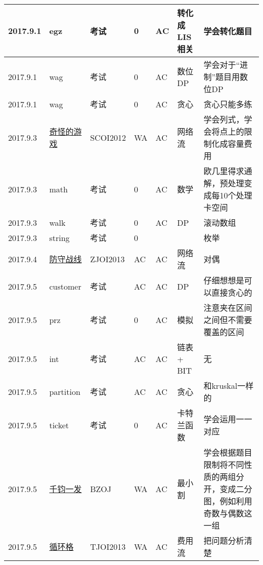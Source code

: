 \documentclass[a4paper]{article}
\begin{document}
\begin{longtable}{|p{1.5cm}|p{2.5cm}|p{1.6cm}|p{1.6cm}|p{1cm}|p{3cm}|p{4cm}|}
		\hline
		2017.9.1 & egz
		 & 考试 & 0 & AC & 转化成LIS相关 & 学会转化题目\\
		
		\hline
		2017.9.1 & wag
		 & 考试 & 0 & AC & 数位DP & 学会对于“进制”题目用数位DP\\
		
		\hline
		2017.9.1 & wag
		 & 考试 & 0 & AC & 贪心 & 贪心只能多练\\
		
		\hline
		2017.9.3 & \href {http://www.lydsy.com/JudgeOnline/problem.php?id=2756}{奇怪的游戏}
		 & SCOI2012 & WA & AC & 网络流 & 学会列式，学会将点上的限制化成容量费用\\
		
		\hline
		2017.9.3 & math
		 & 考试 & 0 & AC & 数学 & 欧几里得求通解，预处理变成每10个处理卡空间\\
		
		\hline
		2017.9.3 & walk
		 & 考试 & 0 & AC & DP & 滚动数组\\
		
		\hline
		2017.9.3 & string
		 & 考试 & 0 & & & 枚举\\
		
		\hline
		2017.9.4 & \href {http://www.lydsy.com/JudgeOnline/problem.php?id=3112}{防守战线}
		 & ZJOI2013 & AC & AC & 网络流 & 对偶\\
		
		\hline
		2017.9.5 & customer
		 & 考试 & AC & AC & DP & 仔细想想是可以直接贪心的\\
		
		\hline
		2017.9.5 & prz
		 & 考试 & 0 & AC & 模拟 & 注意夹在区间之间但不需要覆盖的区间\\
		
		\hline
		2017.9.5 & int
		 & 考试 & AC & AC & 链表 + BIT & 无\\
		
		\hline
		2017.9.5 & partition
		 & 考试 & AC & AC & 贪心 & 和kruskal一样的\\
		
		\hline
		2017.9.5 & ticket
		 & 考试 & 0 & AC & 卡特兰函数 & 学会运用一一对应\\
		
		\hline
		2017.9.5 & \href {http://www.lydsy.com/JudgeOnline/problem.php?id=3158}{千钧一发}
		 & BZOJ & WA & AC & 最小割 & 学会根据题目限制将不同性质的两组分开，变成二分图，例如利用奇数与偶数这一组\\
		
		\hline
		2017.9.5 & \href {http://www.lydsy.com/JudgeOnline/problem.php?id=3171}{循环格}
		 & TJOI2013 & WA & AC & 费用流 & 把问题分析清楚\\
		

\end{longtable}
\end{document}
